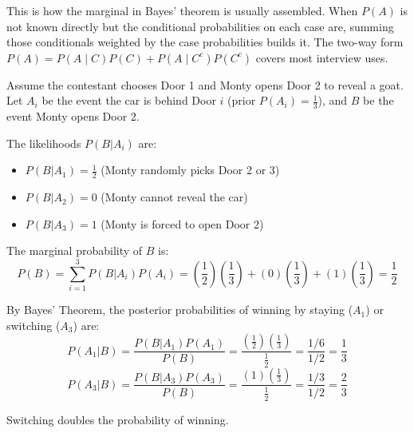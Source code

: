 This is how the marginal in Bayes' theorem is usually assembled. When $P(A)$ is not known directly but the conditional probabilities on each case are, summing those conditionals weighted by the case probabilities builds it. The two-way form $P(A) = P(A \mid C)P(C) + P(A \mid C^c)P(C^c)$ covers most interview uses.

\medskip

\begin{example}
Assume the contestant chooses Door 1 and Monty opens Door 2 to reveal a goat. Let $A_i$ be the event the car is behind Door $i$ (prior $P(A_i) = \frac{1}{3}$), and $B$ be the event Monty opens Door 2.

The likelihoods $P(B|A_i)$ are:
\begin{itemize}[itemsep=-1ex, label=--]
    \item $P(B|A_1) = \frac{1}{2}$ (Monty randomly picks Door 2 or 3)
    \item $P(B|A_2) = 0$ (Monty cannot reveal the car)
    \item $P(B|A_3) = 1$ (Monty is forced to open Door 2)
\end{itemize}

The marginal probability of $B$ is:
\[
P(B) = \sum_{i=1}^3 P(B|A_i)P(A_i) = \left(\frac{1}{2}\right)\left(\frac{1}{3}\right) + (0)\left(\frac{1}{3}\right) + (1)\left(\frac{1}{3}\right) = \frac{1}{2}
\]

By Bayes' Theorem, the posterior probabilities of winning by staying ($A_1$) or switching ($A_3$) are:
\[
P(A_1|B) = \frac{P(B|A_1)P(A_1)}{P(B)} = \frac{\left(\frac{1}{2}\right)\left(\frac{1}{3}\right)}{\frac{1}{2}} = \frac{1/6}{1/2} = \frac{1}{3}
\]
\[
P(A_3|B) = \frac{P(B|A_3)P(A_3)}{P(B)} = \frac{(1)\left(\frac{1}{3}\right)}{\frac{1}{2}} = \frac{1/3}{1/2} = \frac{2}{3}
\]

Switching doubles the probability of winning.
\end{example}
